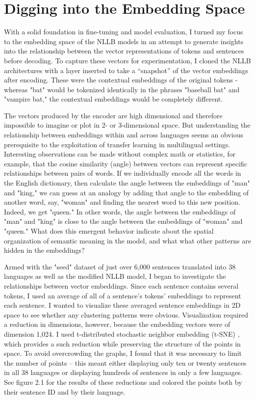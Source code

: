 \section{Digging into the Embedding Space}

With a solid foundation in fine-tuning and model evaluation, I turned my focus to the embedding space of the NLLB models in an attempt to generate insights into the relationship between the vector representations of tokens and sentences before decoding. To capture these vectors for experimentation, I cloned the NLLB architectures with a layer inserted to take a “snapshot” of the vector embeddings after encoding. These were the contextual embeddings of the original tokens - whereas "bat" would be tokenized identically in the phrases "baseball bat" and "vampire bat," the contextual embeddings would be completely different.

The vectors produced by the encoder are high dimensional and therefore impossible to imagine or plot in 2- or 3-dimensional space. But understanding the relationship between embeddings within and across languages seems an obvious prerequisite to the exploitation of transfer learning in multilingual settings. Interesting observations can be made without complex math or statistics, for example, that the cosine similarity (angle) between vectors can represent specific relationships between pairs of words. If we individually encode all the words in the English dictionary, then calculate the angle between the embeddings of "man" and "king," we can guess at an analogy by adding that angle to the embedding of another word, say, "woman" and finding the nearest word to this new position. Indeed, we get "queen." In other words, the angle between the embeddings of "man" and "king" is close to the angle between the embeddings of "woman" and "queen." What does this emergent behavior indicate about the spatial organization of semantic meaning in the model, and what what other patterns are hidden in the embeddings?

Armed with the "seed" dataset of just over 6,000 sentences translated into 38 languages as well as the modified NLLB model, I began to investigate the relationships between vector embeddings. Since each sentence contains several tokens, I used an average of all of a sentence's tokens' embeddings to represent each sentence. I wanted to visualize these averaged sentence embeddings in 2D space to see whether any clustering patterns were obvious. Visualization required a reduction in dimensions, however, because the embedding vectors were of dimension 1,024. I used t-distributed stochastic neighbor embedding (t-SNE) \cite{van2008visualizing}, which provides a such reduction while preserving the structure of the points in space. To avoid overcrowding the graphs, I found that it was necessary to limit the number of points -- this meant either displaying only ten or twenty sentences in all 38 languages or displaying hundreds of sentences in only a few languages. See figure 2.1 for the results of these reductions and colored the points both by their sentence ID and by their language. 

